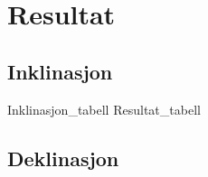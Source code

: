 \section{Resultat}
\subsection{Inklinasjon}

{Inklinasjon_tabell}
{Resultat_tabell}

\subsection{Deklinasjon}